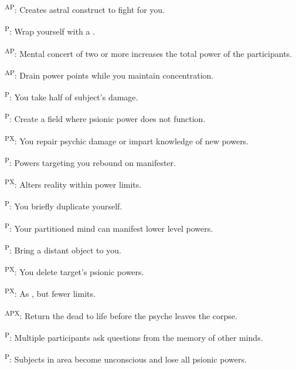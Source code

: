\begin{enumerate*}
      \textsuperscript{AP}: Creates astral construct to fight for you. %

      \textsuperscript{P}: Wrap yourself with a .

      \textsuperscript{AP}: Mental concert of two or more increases the total power of the participants. %

      \textsuperscript{AP}: Drain power points while you maintain concentration. %

      \textsuperscript{P}: You take half of subject's damage.

\item {}\textsuperscript{P}: Create a field where psionic power does not function. %

\item {}\textsuperscript{PX}: You repair psychic damage or impart knowledge of new powers. %

      \textsuperscript{P}: Powers targeting you rebound on manifester. %

\item {}\textsuperscript{PX}: Alters reality within power limits. %

      \textsuperscript{P}: You briefly duplicate yourself. %

      \textsuperscript{P}: Your partitioned mind can manifest lower level powers. %

      \textsuperscript{P}: Bring a distant object to you.

\item {}\textsuperscript{PX}: You delete target's psionic powers. %


      \textsuperscript{PX}: As , but fewer limits. %

      \textsuperscript{APX}: Return the dead to life before the psyche leaves the corpse.

      \textsuperscript{P}: Multiple participants ask questions from the memory of other minds.

      \textsuperscript{P}: Subjects in area become unconscious and lose all psionic powers.
\end{enumerate*}


